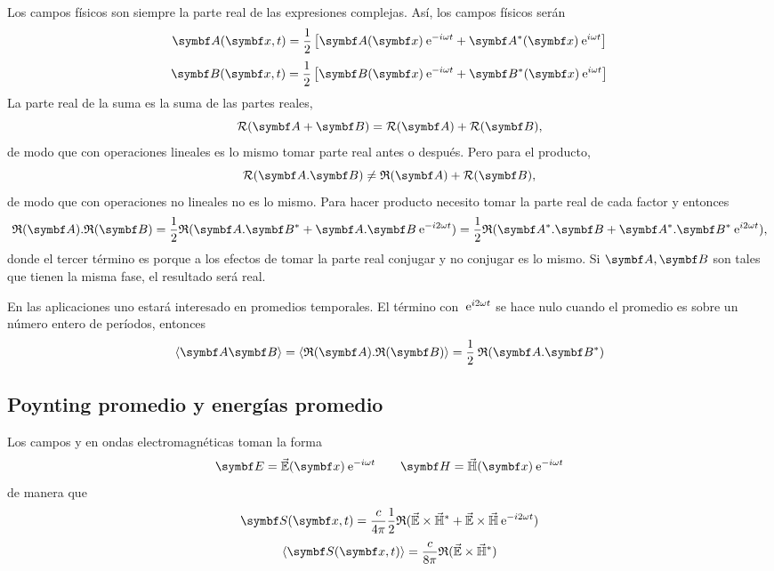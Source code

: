 \documentclass[10pt,oneside]{CBFT_book}
\begin{document}
Los campos físicos son siempre la parte real de las expresiones complejas.
Así, los campos físicos serán
\[
	\vb{A}(\vb{x},t) = \frac{1}{2} \left[ \vb{A}(\vb{x})\euler^{-i\omega t} + 
	\vb{A}^*(\vb{x})\euler^{i\omega t} \right]
\]
\[
	\vb{B}(\vb{x},t) = \frac{1}{2} \left[ \vb{B}(\vb{x})\euler^{-i\omega t} + 
	\vb{B}^*(\vb{x})\euler^{i\omega t} \right]
\]
La parte real de la suma es la suma de las partes reales,
\[
	\mathcal{R}(\vb{A} + \vb{B}) = \mathcal{R}( \vb{A} ) + \mathcal{R}( \vb{B} ),
\]
de modo que con operaciones lineales es lo mismo tomar parte real antes o después.
Pero para el producto,
\[
	\mathcal{R}(\vb{A}.\vb{B}) \neq  \mathfrak{R}( \vb{A} ) + \mathcal{R}( \vb{B} ),
\]
de modo que con operaciones no lineales no es lo mismo.
Para hacer producto necesito tomar la parte real de cada factor y entonces
\[
	\mathfrak{R}( \vb{A} ).\mathfrak{R}( \vb{B} ) = 
	\frac{1}{2}\mathfrak{R}( \vb{A}.\vb{B}^* + 
	\vb{A}.\vb{B} \euler^{ -i 2 \omega t }) =
	\frac{1}{2}\mathfrak{R}( \vb{A}^*.\vb{B} + 
	\vb{A}^*.\vb{B}^* \euler^{ i 2 \omega t }),
\]
donde el tercer término es porque a los efectos de tomar la parte real conjugar y no conjugar es lo
mismo.
Si $\vb{A}, \vb{B}$ son tales que tienen la misma fase, el resultado será real.

En las aplicaciones uno estará interesado en promedios temporales. El término con 
$\:\mathrm{e}^{ i 2 \omega t}$ se hace nulo cuando el promedio es sobre un número entero de períodos,
entonces
\[
	\langle \vb{A} \vb{B} \rangle =
	\langle \mathfrak{R}( \vb{A} ).\mathfrak{R}( \vb{B} ) \rangle =
	\frac{1}{2} \: \mathfrak{R} ( \vb{A}.\vb{B}^* )
\]

\subsection{Poynting promedio y energías promedio}

Los campos  y  en ondas electromagnéticas toman la forma 
\[
	\vb{E} = \vec{\mathbb{E}}(\vb{x})\euler^{-i\omega t} \qquad 
	\vb{H} = \vec{\mathbb{H}}(\vb{x})\euler^{-i\omega t}
\]
de manera que 
\[
	\vb{S}( \vb{x},t ) = \frac{c}{4\pi} \frac{1}{2} \re( \vec{\mathbb{E}} \times \vec{\mathbb{H}}^* + 
		\vec{\mathbb{E}} \times \vec{\mathbb{H}} \euler^{-i2\omega t})
\]
\[
	\langle \vb{S}( \vb{x},t ) \rangle = \frac{c}{8\pi} \re( \vec{\mathbb{E}} \times \vec{\mathbb{H}}^* ) 
\]
\end{document}
